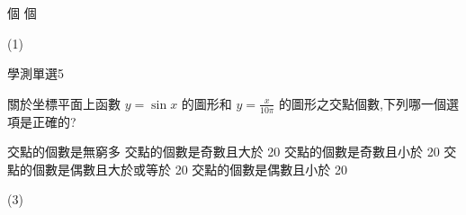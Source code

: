 \begin{QUESTIONS}
\begin{QUESTION}
\begin{QBODY}
\begin{QOPS}
				 個 
				 個
			\end{QOPS}
        \end{QBODY}
        \begin{QFROMS}
        \end{QFROMS}
        \begin{QTAGS}\end{QTAGS}
        \begin{QANS}
            (1)
        \end{QANS}
        \begin{QSOLLIST}
        \end{QSOLLIST}
        \begin{QEMPTYSPACE}
        \end{QEMPTYSPACE}
    \end{QUESTION}
    \begin{QUESTION}
        \begin{ExamInfo}{96}{學測}{單選}{5}
        \end{ExamInfo}
        \begin{ExamAnsRateInfo}{47}{67}{46}{28}
        \end{ExamAnsRateInfo}
        \begin{QBODY}
            關於坐標平面上函數 $y = \sin x$ 的圖形和 $y = \frac{x}{10\pi}$ 的圖形之交點個數,下列哪一個選項是正確的? 
			\begin{QOPS}
				\QOP 交點的個數是無窮多 
				\QOP 交點的個數是奇數且大於 20 
				\QOP 交點的個數是奇數且小於 20 
				\QOP 交點的個數是偶數且大於或等於 20 
				\QOP 交點的個數是偶數且小於 20
			\end{QOPS}
        \end{QBODY}
        \begin{QFROMS}
        \end{QFROMS}
        \begin{QTAGS}\end{QTAGS}
        \begin{QANS}
            (3)
        \end{QANS}
        \begin{QSOLLIST}
        \end{QSOLLIST}
        \begin{QEMPTYSPACE}
        \end{QEMPTYSPACE}
    \end{QUESTION}
\end{QUESTIONS}

